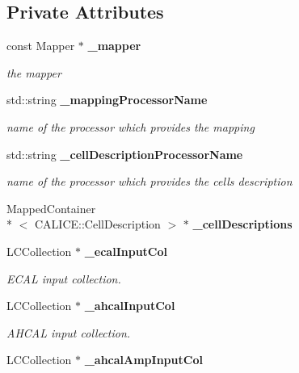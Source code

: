 \subsection*{Private Attributes}
\begin{DoxyCompactItemize}
\item 
const Mapper $\ast$ {\bf \-\_\-mapper}\label{classCALICE_1_1AngleTrackFinder_a1e8ade0f953c3f0e73665cf8bb6fc58f}

\begin{DoxyCompactList}\small\item\em the mapper \end{DoxyCompactList}\item 
std\-::string {\bf \-\_\-mapping\-Processor\-Name}\label{classCALICE_1_1AngleTrackFinder_a8ed332f4a4fac3a16df92f32cec1ca23}

\begin{DoxyCompactList}\small\item\em name of the processor which provides the mapping \end{DoxyCompactList}\item 
std\-::string {\bf \-\_\-cell\-Description\-Processor\-Name}\label{classCALICE_1_1AngleTrackFinder_a9094f5b2aa449c3bd3180fe4fc7094d2}

\begin{DoxyCompactList}\small\item\em name of the processor which provides the cells description \end{DoxyCompactList}\item 
Mapped\-Container\\*
$<$ C\-A\-L\-I\-C\-E\-::\-Cell\-Description $>$ $\ast$ {\bfseries \-\_\-cell\-Descriptions}\label{classCALICE_1_1AngleTrackFinder_a570dfea9f64f3eaf487ea8db682d03ec}

\item 
L\-C\-Collection $\ast$ {\bf \-\_\-ecal\-Input\-Col}\label{classCALICE_1_1AngleTrackFinder_a6c55f00b24dedf933046c374d57567a2}

\begin{DoxyCompactList}\small\item\em E\-C\-A\-L input collection. \end{DoxyCompactList}\item 
L\-C\-Collection $\ast$ {\bf \-\_\-ahcal\-Input\-Col}\label{classCALICE_1_1AngleTrackFinder_a6294fed90962d5ecaf2d63f4f119c808}

\begin{DoxyCompactList}\small\item\em A\-H\-C\-A\-L input collection. \end{DoxyCompactList}\item 
L\-C\-Collection $\ast$ {\bf \-\_\-ahcal\-Amp\-Input\-Col}\label{classCALICE_1_1AngleTrackFinder_a63d915b7e5159274be1cec89db2c0390}


\end{DoxyCompactItemize}
